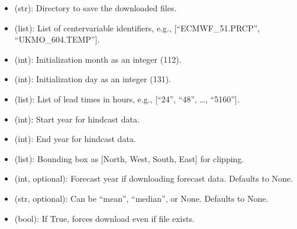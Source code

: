 \documentclass[letterpaper,10pt,english]{sphinxmanual}
\begin{document}
\sphinxAtStartPar
{}
\begin{itemize}
\item {} 
\sphinxAtStartPar
{} (str): Directory to save the downloaded files.

\item {} 
\sphinxAtStartPar
{} (list): List of center\sphinxhyphen{}variable identifiers, e.g., {[}“ECMWF\_51.PRCP”, “UKMO\_604.TEMP”{]}.

\item {} 
\sphinxAtStartPar
{} (int): Initialization month as an integer (1\sphinxhyphen{}12).

\item {} 
\sphinxAtStartPar
{} (int): Initialization day as an integer (1\sphinxhyphen{}31).

\item {} 
\sphinxAtStartPar
{} (list): List of lead times in hours, e.g., {[}“24”, “48”, …, “5160”{]}.

\item {} 
\sphinxAtStartPar
{} (int): Start year for hindcast data.

\item {} 
\sphinxAtStartPar
{} (int): End year for hindcast data.

\item {} 
\sphinxAtStartPar
{} (list): Bounding box as {[}North, West, South, East{]} for clipping.

\item {} 
\sphinxAtStartPar
{} (int, optional): Forecast year if downloading forecast data. Defaults to None.

\item {} 
\sphinxAtStartPar
{} (str, optional): Can be “mean”, “median”, or None. Defaults to None.

\item {} 
\sphinxAtStartPar
{} (bool): If True, forces download even if file exists.

\end{itemize}
\end{document}

